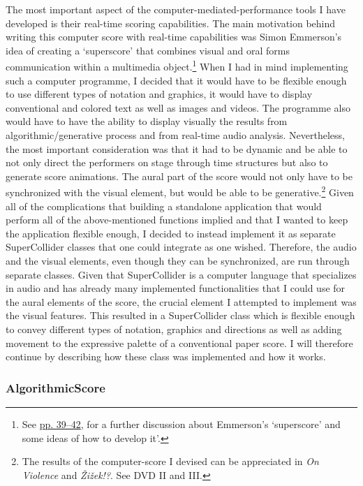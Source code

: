 The most important aspect of the computer-mediated-performance tools I have developed is their real-time scoring capabilities. The main motivation behind writing this computer score with real-time capabilities was Simon Emmerson's idea of creating a `superscore' that combines visual and oral forms communication within a multimedia object.\footnote{See \hyperlink{superscore}{pp. 39--42}, for a further discussion about Emmerson's `superscore' and some ideas of how to develop it'.} When I had in mind implementing such a computer programme, I decided that it would have to be flexible enough to use different types of notation and graphics, it would have to display conventional and colored text as well as images and videos. The programme also would have to have the ability to display visually the results from algorithmic/generative process and from real-time audio analysis. Nevertheless, the most important consideration was that it had to be dynamic and be able to not only direct the performers on stage through time structures but also to generate score animations. The aural part of the score would not only have to be synchronized with the visual element, but would be able to be generative.\footnote{The results of the computer-score I devised can be appreciated in \emph{On Violence} and \emph{\v{Z}i\v{z}ek!?}. See DVD II and III.} Given all of the complications that building a standalone application that would perform all of the above-mentioned functions implied and that I wanted to keep the application flexible enough, I decided to instead implement it as separate SuperCollider classes that one could integrate as one wished. Therefore, the audio and the visual elements, even though they can be synchronized, are run through separate classes. Given that SuperCollider is a computer language that specializes in audio and has already many implemented functionalities that I could use for the aural elements of the score, the crucial element I attempted to implement was the visual features. This resulted in a SuperCollider class which is flexible enough to convey different types of notation, graphics and directions as well as adding movement to the expressive palette of a conventional paper score. I will therefore continue by describing how these class was implemented and how it works.

\subsubsection{AlgorithmicScore}

